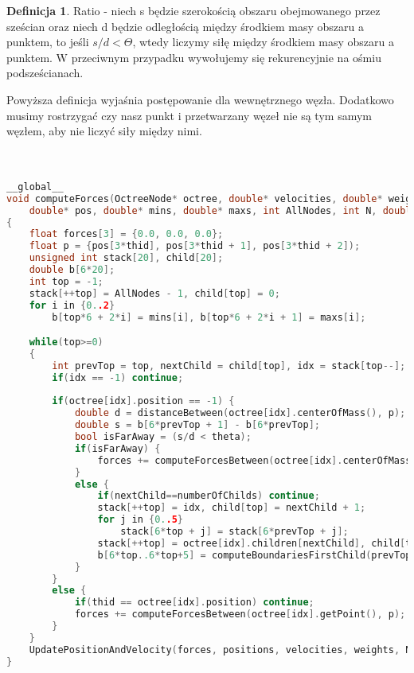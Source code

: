\documentclass[14pt,twoside,a4paper]{article}
\theoremstyle{definition}
\newtheorem{definition}{Definicja}[section]
\begin{document}
\theoremstyle{definition}
\begin{definition}{Ratio}
- niech s będzie szerokością obszaru obejmowanego przez sześcian oraz niech d będzie odległością między środkiem masy obszaru a punktem, to jeśli $s/d < \Theta$, wtedy liczymy siłę między środkiem masy obszaru a punktem. W przeciwnym przypadku wywołujemy się rekurencyjnie na ośmiu podsześcianach.
\end{definition}

Powyższa definicja wyjaśnia postępowanie dla wewnętrznego węzła. Dodatkowo musimy rostrzygać czy nasz punkt i przetwarzany węzeł nie są tym samym węzłem, aby nie liczyć siły między nimi.\\~\\~\\

\begin{lstlisting}[language=C++, frame=single, framerule=2pt, caption=Liczenie siły oddziałującej na ciało w układzie]
__global__
void computeForces(OctreeNode* octree, double* velocities, double* weights, 
    double* pos, double* mins, double* maxs, int AllNodes, int N, double dt) 
{	
    float forces[3] = {0.0, 0.0, 0.0};
    float p = {pos[3*thid], pos[3*thid + 1], pos[3*thid + 2]);
    unsigned int stack[20], child[20];
    double b[6*20];
    int top = -1;
    stack[++top] = AllNodes - 1, child[top] = 0;
    for i in {0..2}
        b[top*6 + 2*i] = mins[i], b[top*6 + 2*i + 1] = maxs[i];

    while(top>=0) 
    {
    	int prevTop = top, nextChild = child[top], idx = stack[top--];
        if(idx == -1) continue;
        
        if(octree[idx].position == -1) {
            double d = distanceBetween(octree[idx].centerOfMass(), p);
        	double s = b[6*prevTop + 1] - b[6*prevTop];
            bool isFarAway = (s/d < theta);
            if(isFarAway) {
            	forces += computeForcesBetween(octree[idx].centerOfMass, p);
            }
            else {
                if(nextChild==numberOfChilds) continue;
                stack[++top] = idx, child[top] = nextChild + 1;
                for j in {0..5}
                    stack[6*top + j] = stack[6*prevTop + j];
                stack[++top] = octree[idx].children[nextChild], child[top] = 0;
                b[6*top..6*top+5] = computeBoundariesFirstChild(prevTop);
            }
        } 
        else {
       	    if(thid == octree[idx].position) continue;
        	forces += computeForcesBetween(octree[idx].getPoint(), p);	
        }
    }    
    UpdatePositionAndVelocity(forces, positions, velocities, weights, N, dt);
}
\end{lstlisting}
\end{document}
